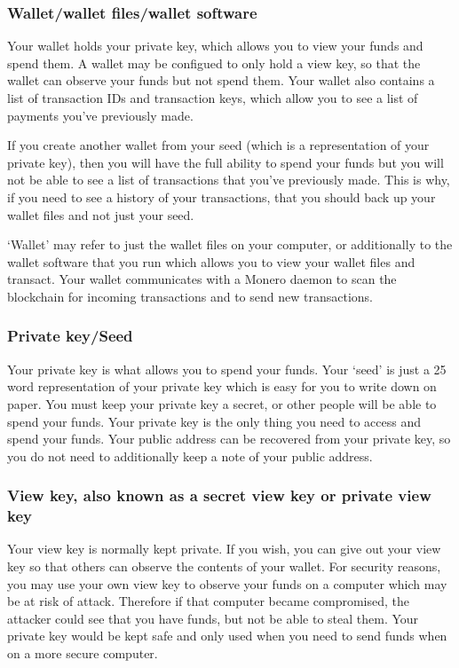 \subsubsection{Wallet/wallet files/wallet software}
	Your wallet holds your private key, which allows you to view your funds and spend them. A wallet may be configued to only hold a view key, so that the wallet can observe your funds but not spend them. Your wallet also contains a list of transaction IDs and transaction keys, which allow you to see a list of payments you've previously made. \par
	If you create another wallet from your seed (which is a representation of your private key), then you will have the full ability to spend your funds but you will not be able to see a list of transactions that you've previously made. This is why, if you need to see a history of your transactions, that you should back up your wallet files and not just your seed. \par
	`Wallet' may refer to just the wallet files on your computer, or additionally to the wallet software that you run which allows you to view your wallet files and transact. Your wallet communicates with a Monero daemon to scan the blockchain for incoming transactions and to send new transactions.
\subsubsection{Private key/Seed}
	Your private key is what allows you to spend your funds. Your `seed' is just a 25 word representation of your private key which is easy for you to write down on paper. You must keep your private key a secret, or other people will be able to spend your funds. Your private key is the only thing you need to access and spend your funds. Your public address can be recovered from your private key, so you do not need to additionally keep a note of your public address.
\subsubsection{View key, also known as a secret view key or private view key}
	Your view key is normally kept private. If you wish, you can give out your view key so that others can observe the contents of your wallet. For security reasons, you may use your own view key to observe your funds on a computer which may be at risk of attack. Therefore if that computer became compromised, the attacker could see that you have funds, but not be able to steal them. Your private key would be kept safe and only used when you need to send funds when on a more secure computer.
